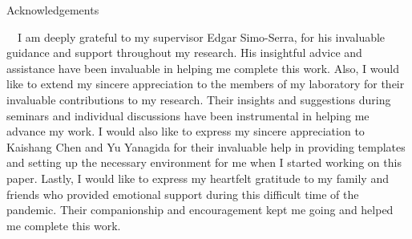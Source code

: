\documentclass[a4paper, oneside, 12pt, dvipdfmx]{book}
\begin{document}
\pagebreak
\hspace{0pt}
\vfill 
    \begin{center}
    Acknowledgements
    \end{center}
    　I am deeply grateful to my supervisor Edgar Simo-Serra, for his invaluable 
    guidance and support throughout my research. His insightful advice and assistance 
    have been invaluable in helping me complete this work.
    Also, I would like to extend my sincere appreciation to the members of my laboratory
    for their invaluable contributions to my research. Their insights and suggestions 
    during seminars and individual discussions have been instrumental in helping me 
    advance my work.
    I would also like to express my sincere appreciation to Kaishang Chen and  Yu Yanagida 
    for their invaluable help in providing templates and setting up the necessary 
    environment for me when I started working on this paper. 
    Lastly, I would like to express my heartfelt gratitude to my family and friends 
    who provided emotional support during this difficult time of the pandemic. 
    Their companionship and encouragement kept me going and helped me complete this work. 



\vfill
\pagebreak


\tableofcontents
\listoffigures 
\listoftables

\clearpage







\printbibliography
\end{document}
